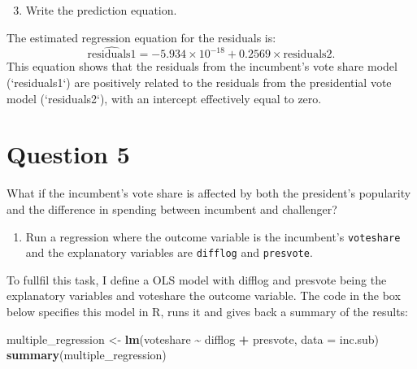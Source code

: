 \documentclass[
]{article}
\newenvironment{Shaded}{\begin{snugshade}}{\end{snugshade}}
\newcommand{\AttributeTok}[1]{\textcolor[rgb]{0.13,0.29,0.53}{#1}}
\newcommand{\FunctionTok}[1]{\textcolor[rgb]{0.13,0.29,0.53}{\textbf{#1}}}
\newcommand{\NormalTok}[1]{#1}
\newcommand{\OtherTok}[1]{\textcolor[rgb]{0.56,0.35,0.01}{#1}}
\newcommand{\SpecialCharTok}[1]{\textcolor[rgb]{0.81,0.36,0.00}{\textbf{#1}}}
\begin{document}
\begin{enumerate}\setcounter{enumi}{2}		
	\item Write the prediction equation.
\end{enumerate}

\noindent The estimated regression equation for the residuals is:
\[
\widehat{\text{residuals1}} = -5.934 \times 10^{-18} + 0.2569 \times \text{residuals2}.
\]
This equation shows that the residuals from the incumbent’s vote share model (`residuals1`) are positively related to the residuals from the presidential vote model (`residuals2`), with an intercept effectively equal to zero.





\section*{Question 5}
\noindent What if the incumbent's vote share is affected by both the president's popularity and the difference in spending between incumbent and challenger? 
\begin{enumerate}
	\item Run a regression where the outcome variable is the incumbent's \texttt{voteshare} and the explanatory variables are \texttt{difflog} and \texttt{presvote}.
\end{enumerate}
To fullfil this task, I define a OLS model with difflog and presvote being the explanatory variables and voteshare the outcome variable. The code in the box below specifies this model in R, runs it and gives back a summary of the results:
\begin{Shaded}
	\begin{Highlighting}[]
\NormalTok{multiple\_regression }\OtherTok{\textless{}{-}} \FunctionTok{lm}\NormalTok{(voteshare }\SpecialCharTok{\textasciitilde{}}\NormalTok{ difflog }\SpecialCharTok{+}\NormalTok{ presvote, }\AttributeTok{data =}\NormalTok{ inc.sub)}
\FunctionTok{summary}\NormalTok{(multiple\_regression)}
	\end{Highlighting}
\end{Shaded}
\end{document}
